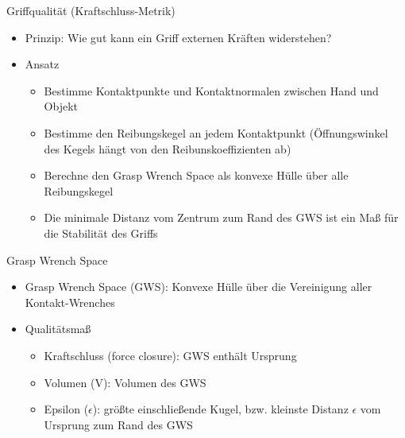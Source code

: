 \documentclass[paper=a4, fontsize=11pt]{scrartcl} %
\numberwithin{equation}{section} %
\numberwithin{figure}{section} %
\numberwithin{table}{section} %
\begin{document}
Griffqualität (Kraftschluss-Metrik)
\begin{itemize}
\item Prinzip: Wie gut kann ein Griff externen Kräften widerstehen?
\item Ansatz
\begin{itemize}
\item Bestimme Kontaktpunkte und Kontaktnormalen zwischen Hand und Objekt
\item Bestimme den Reibungskegel an jedem Kontaktpunkt (Öffnungswinkel des Kegels hängt von den Reibunskoeffizienten ab)
\item Berechne den Grasp Wrench Space als konvexe Hülle über alle Reibungskegel
\item Die minimale Distanz vom Zentrum zum Rand des GWS ist ein Maß für die Stabilität des Griffs
\end{itemize}
\end{itemize}

Grasp Wrench Space
\begin{itemize}
\item Grasp Wrench Space (GWS): Konvexe Hülle über die Vereinigung aller Kontakt-Wrenches
\item Qualitätsmaß
\begin{itemize}
\item Kraftschluss (force closure): GWS enthält Ursprung
\item Volumen (V): Volumen des GWS
\item Epsilon ($\epsilon$): größte einschließende Kugel, bzw. kleinste Distanz $\epsilon$ vom Ursprung zum Rand des GWS
\end{itemize}
\end{itemize}
\end{document}

